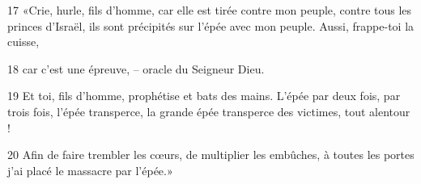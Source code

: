 17 «Crie, hurle, fils d’homme, car elle est tirée contre mon peuple, contre tous les princes d’Israël, ils sont précipités sur l’épée avec mon peuple. Aussi, frappe-toi la cuisse,

18 car c’est une épreuve, – oracle du Seigneur Dieu.

19 Et toi, fils d’homme, prophétise et bats des mains. L’épée par deux fois, par trois fois, l’épée transperce, la grande épée transperce des victimes, tout alentour !

20 Afin de faire trembler les cœurs, de multiplier les embûches, à toutes les portes j’ai placé le massacre par l’épée.»
